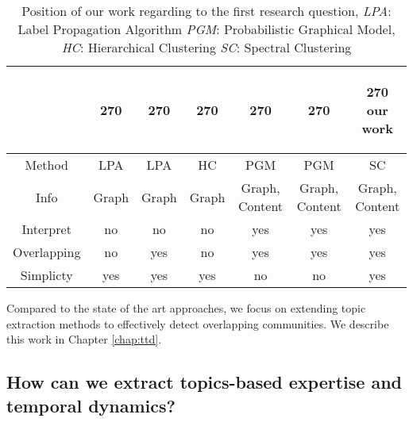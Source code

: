     \begin{table}[htp]
        \centering
        \begin{tabular}{c c c c c c c}
        &
        \begin{turn}{270}
            \cite{raghavan2007near} 
        \end{turn} 
        &
        \begin{turn}{270}
            \cite{DBLP:journals/csur/XieKS13} 
        \end{turn} 
        &
        \begin{turn}{270} 
            \cite{girvan2002community}
        \end{turn}
        &
        \begin{turn}{270} 
            \cite{yang2013community}
        \end{turn}
        &
        \begin{turn}{270}
            \cite{hu2014user}
        \end{turn}
        &
        
        \begin{turn}{270}
        our work
        \end{turn}
        \\ \hline
        Method &LPA & LPA & HC & PGM &PGM & SC\\ \hline
        Info  & Graph & Graph &Graph & Graph, Content & Graph, Content& Graph, Content\\ \hline
        Interpret& no & no & no & yes & yes & yes \\ \hline
        Overlapping & no & yes & no & yes & yes & yes \\ \hline
        Simplicty & yes & yes & yes & no & no & yes \\ \hline
        \end{tabular}
        \caption{Position of our work regarding to the first research question, \textit{LPA}: Label Propagation Algorithm \textit{PGM}: Probabilistic Graphical Model, \textit{HC}: Hierarchical Clustering \textit{SC}: Spectral Clustering}
        \label{tab:rq4compare}
    \end{table}
Compared to the state of the art approaches, we focus on extending topic extraction methods to effectively detect overlapping communities. We describe this work in Chapter \ref{chap:ttd}.



    
\subsection{How can we extract topics-based expertise and temporal dynamics?}
    
